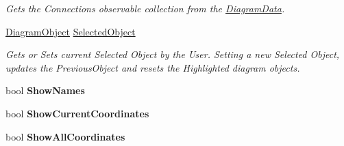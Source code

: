 \begin{DoxyCompactItemize}
\begin{DoxyCompactList}\small\item\em Gets the Connections observable collection from the \hyperlink{class_prototipo_t_f_g_1_1_diagram_data}{Diagram\+Data}. \end{DoxyCompactList}\item 
\hyperlink{class_prototipo_t_f_g_1_1_diagram_object}{Diagram\+Object} \hyperlink{class_prototipo_t_f_g_1_1_main_view_model_a5af0877eee5d1a003d61a3beba45272a}{Selected\+Object}
\begin{DoxyCompactList}\small\item\em Gets or Sets current Selected Object by the User. Setting a new Selected Object, updates the Previous\+Object and resets the Highlighted diagram objects. \end{DoxyCompactList}\item 
\hypertarget{class_prototipo_t_f_g_1_1_main_view_model_a833391f624125554fc5a505bfc0cd5a3}{}bool {\bfseries Show\+Names}\label{class_prototipo_t_f_g_1_1_main_view_model_a833391f624125554fc5a505bfc0cd5a3}

\item 
\hypertarget{class_prototipo_t_f_g_1_1_main_view_model_ae790f5eaa791d80fdd18faae1a4d4316}{}bool {\bfseries Show\+Current\+Coordinates}\label{class_prototipo_t_f_g_1_1_main_view_model_ae790f5eaa791d80fdd18faae1a4d4316}

\item 
\hypertarget{class_prototipo_t_f_g_1_1_main_view_model_aea796337398d6eb8cb9051a2c13c1369}{}bool {\bfseries Show\+All\+Coordinates}\label{class_prototipo_t_f_g_1_1_main_view_model_aea796337398d6eb8cb9051a2c13c1369}


\end{DoxyCompactItemize}
